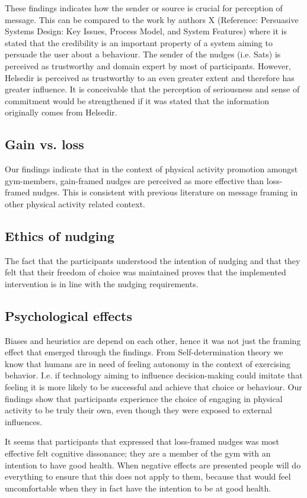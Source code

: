 These findings indicates how the sender or source is crucial for perception of message. This can be compared to the work by authors X \cite{oinas-kukkonen_persuasive_2009} (Reference: Persuasive Systems Design: Key Issues, Process Model, and System Features) where it is stated that the credibility is an important property of a system aiming to persuade the user about a behaviour. The sender of the nudges (i.e. Sats) is perceived as trustworthy and domain expert by most of participants. However, Helsedir is perceived as trustworthy to an even greater extent and therefore has greater influence. It is conceivable that the perception of seriousness and sense of commitment would be strengthened if it was stated that the information originally comes from Helsedir. 

\subsection{Gain vs. loss}
Our findings indicate that in the context of physical activity promotion amongst gym-members, gain-framed nudges are perceived as more effective than loss-framed nudges. This is consistent with previous literature on message framing in other physical activity related context. 

\subsection{Ethics of nudging}
The fact that the participants understood the intention of nudging and that they felt that their freedom of choice was maintained proves that the implemented intervention is in line with the nudging requirements.

\subsection{Psychological effects}
Biases and heuristics are depend on each other, hence it was not just the framing effect that emerged through the findings. From Self-determination theory we know that humans are in need of feeling autonomy in the context of exercising behavior. I.e. if technology aiming to influence decision-making could imitate that feeling it is more likely to be successful and achieve that choice or behaviour. Our findings show that participants experience the choice of engaging in physical activity to be truly their own, even though they were exposed to external influences. 

It seems that participants that expressed that loss-framed nudges was most effective felt cognitive dissonance; they are a member of the gym with an intention to have good health. When negative effects are presented people will do everything to ensure that this does not apply to them, because that would feel uncomfortable when they in fact have the intention to be at good health. 

